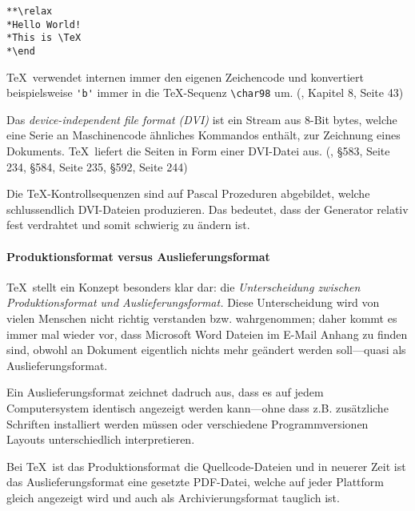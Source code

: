 \begin{verbatim}
**\relax
*Hello World!
*This is \TeX
*\end
\end{verbatim}

\TeX~verwendet internen immer den eigenen Zeichencode und konvertiert beispielsweise
\lstinline|'b'| immer in die \TeX-Sequenz \lstinline|\char98| um.
(\cite{tex-a}, Kapitel 8, Seite 43)

Das \emph{device-independent file format (DVI)} ist ein Stream aus
8-Bit bytes, welche eine Serie an
Maschinencode ähnliches Kommandos enthält, zur Zeichnung eines Dokuments.
\TeX~liefert die Seiten in Form einer DVI-Datei aus.
(\cite{tex-b}, §583, Seite 234, §584, Seite 235, §592, Seite 244)

Die \TeX-Kontrollsequenzen sind auf Pascal Prozeduren abgebildet,
welche schlussendlich DVI-Dateien produzieren. Das bedeutet, dass der Generator
relativ fest verdrahtet und somit schwierig zu ändern ist.

\paragraph{Produktionsformat versus Auslieferungsformat}

\TeX~stellt ein Konzept besonders klar dar: die \emph{Unterscheidung
zwischen Produktionsformat und Auslieferungsformat.} Diese Unterscheidung
wird von vielen Menschen nicht richtig verstanden bzw. wahrgenommen; daher kommt
es immer mal wieder vor, dass Microsoft Word Dateien im E-Mail Anhang zu
finden sind, obwohl an Dokument eigentlich nichts mehr geändert werden
soll---quasi als Auslieferungsformat.

Ein Auslieferungsformat zeichnet dadruch aus, dass es auf jedem
Computersystem identisch angezeigt werden kann---ohne dass z.B. zusätzliche
Schriften installiert werden müssen oder verschiedene Programmversionen
Layouts unterschiedlich interpretieren.

Bei \TeX~ist das Produktionsformat die Quellcode-Dateien und in neuerer
Zeit ist das Auslieferungsformat eine gesetzte PDF-Datei, welche auf jeder
Plattform gleich angezeigt wird und auch als Archivierungsformat tauglich
ist.
